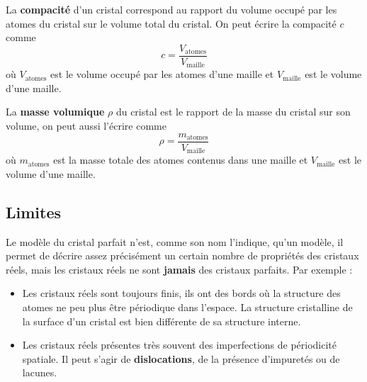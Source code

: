 \documentclass{cours}
\begin{document}
La \textbf{compacité} d'un cristal correspond au rapport du volume occupé par les atomes du cristal sur le volume total du cristal. On peut écrire la compacité $c$ comme
\begin{equation}
  c= \frac{V_\text{atomes}}{V_\text{maille}}
\end{equation}
où $V_\text{atomes}$ est le volume occupé par les atomes d'une maille et $V_\text{maille}$ est le volume d'une maille.

La \textbf{masse volumique} $\rho$ du cristal est le rapport de la masse du cristal sur son volume, on peut aussi l'écrire comme 
\begin{equation}
  \rho = \frac{m_\text{atomes}}{V_\text{maille}}
\end{equation}
où $m_\text{atomes}$ est la masse totale des atomes contenus dans une maille et $V_\text{maille}$ est le volume d'une maille.


\subsection{Limites}%
\label{sub:limites}
Le modèle du cristal parfait n'est, comme son nom l'indique, qu'un modèle, il permet de décrire assez précisément un certain nombre de propriétés des cristaux réels, mais les cristaux réels ne sont \textbf{jamais} des cristaux parfaits. Par exemple :
\begin{itemize}
  \item Les cristaux réels sont toujours finis, ils ont des bords où la structure des atomes ne peu plus être périodique dans l'espace. La structure cristalline de la surface d'un cristal est bien différente de sa structure interne.

  \item Les cristaux réels présentes très souvent des imperfections de périodicité spatiale. Il peut s'agir de \textbf{dislocations}, de la présence d'impuretés ou de lacunes.
\end{itemize}

\begin{center}
\end{center}
\end{document}
